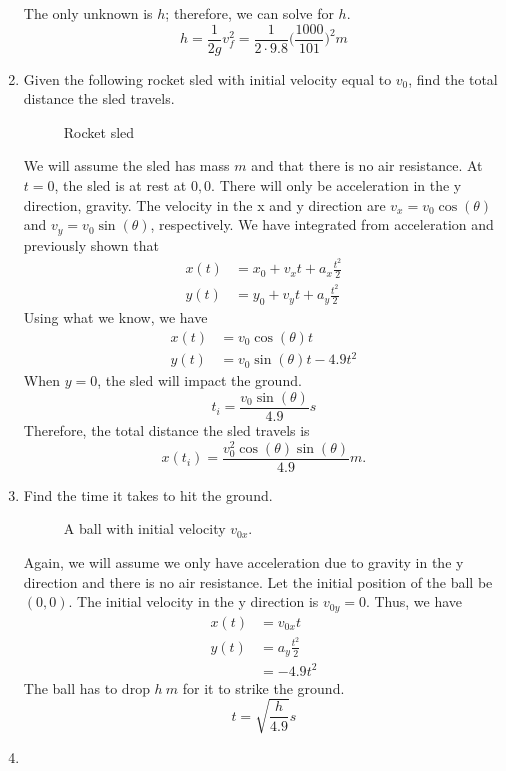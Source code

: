 \begin{enumerate}
  The only unknown is \(h\); therefore, we can solve for \(h\).
  \[
  h = \frac{1}{2g}v_f^2 = \frac{1}{2\cdot 9.8}\Big(\frac{1000}{101}\Big)^2 m
  \]
\item
  Given the following rocket sled with initial velocity equal to \(v_0\), find
  the total distance the sled travels.
  \begin{figure}[H]
    \centering
    
    \caption{Rocket sled}
  \end{figure}
  We will assume the sled has mass \(m\) and that there is no air resistance.
  At \(t = 0\), the sled is at rest at \(0, 0\).
  There will only be acceleration in the y direction, gravity.
  The velocity in the x and y direction are \(v_x = v_0\cos(\theta)\) and
  \(v_y = v_0\sin(\theta)\), respectively.
  We have integrated from acceleration and previously shown that
  \begin{align*}
    x(t) &= x_0 + v_xt + a_x\frac{t^2}{2}\\
    y(t) &= y_0 + v_yt + a_y\frac{t^2}{2}
  \end{align*}
  Using what we know, we have
  \begin{align*}
    x(t) &= v_0\cos(\theta)t\\
    y(t) &= v_0\sin(\theta)t - 4.9t^2
  \end{align*}
  When \(y = 0\), the sled will impact the ground.
  \[
  t_i = \frac{v_0\sin(\theta)}{4.9}s
  \]
  Therefore, the total distance the sled travels is
  \[
  x(t_i) = \frac{v_0^2\cos(\theta)\sin(\theta)}{4.9}m.
  \]
\item
  Find the time it takes to hit the ground.
  \begin{figure}[H]
    \centering
    
    \caption{A ball with initial velocity \(v_{0x}\).}
  \end{figure}
  Again, we will assume we only have acceleration due to gravity in the y
  direction and there is no air resistance.
  Let the initial position of the ball be \((0, 0)\).
  The initial velocity in the y direction is \(v_{0y} = 0\).
  Thus, we have
  \begin{align*}
    x(t) &= v_{0x}t\\
    y(t) &= a_y\frac{t^2}{2}\\
         &= -4.9t^2
  \end{align*}
  The ball has to drop \(h \ m\) for it to strike the ground.
  \[
  t = \sqrt{\frac{h}{4.9}}s
  \]
\item

\end{enumerate}
